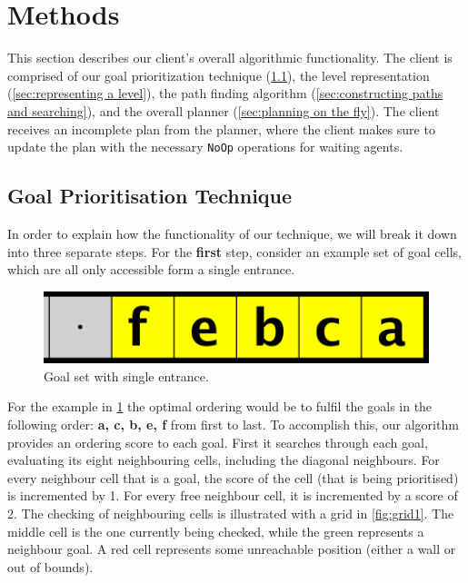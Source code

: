 \section{Methods}
\label{sec:methods}


This section describes our client's overall algorithmic functionality.
The client is comprised of our goal prioritization technique (\cref{methods:goal_ordering}), the level representation (\cref{sec:representing a level}), the path finding algorithm (\cref{sec:constructing paths and searching}), and the overall planner (\cref{sec:planning on the fly}).
The client receives an incomplete plan from the planner, where the client makes sure to update the plan with the necessary \texttt{NoOp} operations for waiting agents.

\subsection{Goal Prioritisation Technique}
\label{methods:goal_ordering}

In order to explain how the functionality of our technique, we will break it down into three separate steps.
For the \textbf{first} step, consider an example set of goal cells, which are all only accessible form a single entrance. 

\begin{figure}[h!]
  \centering
  \includegraphics[width=.5\columnwidth]{graphics/ie_level.png}
  \caption{\label{fig:sample}Goal set with single entrance.}
\end{figure}

For the example in \cref{fig:sample} the optimal ordering would be to fulfil the goals in the following order: \textbf{a, c, b, e, f} from first to last. 
To accomplish this, our algorithm provides an ordering score to each goal. 
First it searches through each goal, evaluating its eight neighbouring cells, including the diagonal neighbours. 
For every neighbour cell that is a goal, the score of the cell (that is being prioritised) is incremented by 1.
For every free neighbour cell, it is incremented by a score of 2. 
The checking of neighbouring cells is illustrated with a grid in \cref{fig:grid1}. 
The middle cell is the one currently being checked, while the green represents a neighbour goal. 
A red cell represents some unreachable position (either a wall or out of bounds).

